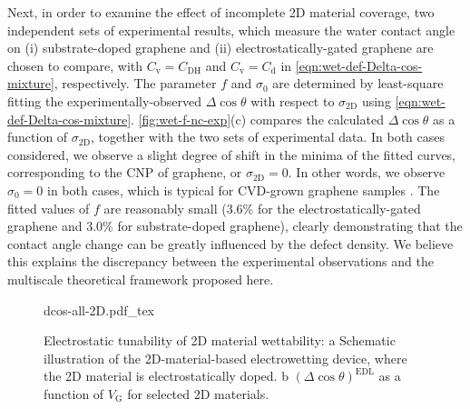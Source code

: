 Next, in order to examine the effect of incomplete 2D material
coverage, two independent sets of experimental results, which measure
the water contact angle on (i) substrate-doped graphene
\autocite{Ashraf_2016_doping} and (ii) electrostatically-gated
graphene \autocite{Hong_2016_mechanism} are chosen to compare, with
\(C_{\mathrm{v}} = C_{\mathrm{DH}}\) and \(C_{\mathrm{v}} =
C_{\mathrm{d}}\) in \autoref{eqn:wet-def-Delta-cos-mixture}, respectively. The
parameter \(f\) and \(\sigma_{0}\) are determined by least-square fitting
the experimentally-observed \(\Delta \cos \theta\) with respect to
\(\sigma_{\mathrm{2D}}\) using \autoref{eqn:wet-def-Delta-cos-mixture}. 
\autoref{fig:wet-f-nc-exp}(c) compares the calculated \(\Delta \cos \theta\) as a
function of \(\sigma_{\mathrm{2D}}\), together with the two sets of
experimental data. In both cases considered, we observe a slight
degree of shift in the minima of the fitted curves, corresponding to
the CNP of graphene, or \(\sigma_{\mathrm{2D}} = 0\). In other words, we
observe \(\sigma_{0} = 0\) in both cases, which is typical for
CVD-grown graphene samples
\autocite{Shih_2015_PartiallyScreened,goniszewski_correlation_2016}.  The
fitted values of \(f\) are reasonably small (3.6\% for the
electrostatically-gated graphene and 3.0\% for substrate-doped
graphene), clearly demonstrating that the contact angle change can be
greatly influenced by the defect density. We believe this explains the
discrepancy between the experimental observations and the multiscale
theoretical framework proposed here.

\begin{figure}[!htbp]
  \centering
  {dcos-all-2D.pdf_tex}
\caption{\label{fig:wet-dcos-all-2D} Electrostatic tunability of 2D
  material wettability: a Schematic illustration of the
  2D-material-based electrowetting device, where the 2D material is
  electrostatically doped. b \((\Delta\cos\theta)^{\mathrm{EDL}}\) as
  a function of \(V_{\mathrm{G}}\) for selected 2D materials.}
\end{figure}


